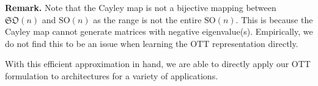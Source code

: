 \textbf{Remark.} Note that the Cayley map is not a bijective mapping between $\mathfrak{SO}(n)$ and $\text{SO}(n)$ as the range is not the entire $\text{SO}(n)$. This is because the Cayley map cannot generate matrices with negative eigenvalue(s). Empirically, we do not find this to be an issue when learning the OTT representation directly.

With this efficient approximation in hand, we are able to directly apply our OTT formulation to architectures for a variety of applications.

